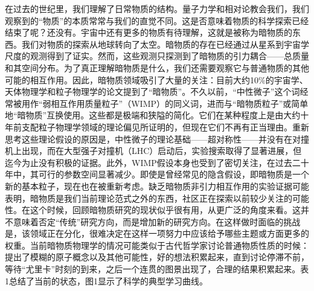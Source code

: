 
在过去的世纪里，我们理解了日常物质的结构。量子力学和相对论教会我们，我们观察到的“物质”的本质常常与我们的直觉不同。这是否意味着物质的科学探索已经结束了呢？还没有。宇宙中还有更多的物质有待理解，这就是被称为暗物质的东西。我们对物质的探索从地球转向了太空。暗物质的存在已经通过从星系到宇宙学尺度的观测得到了证实。然而，这些观测只探测到了暗物质的引力耦合——总质量和其空间分布。为了真正理解暗物质是什么，我们还需要观察它与普通物质的其他可能的相互作用。因此，暗物质领域吸引了大量的关注：目前大约10\%的宇宙学、天体物理学和粒子物理学的论文提到了“暗物质”。不久以前，“中性微子”这个词经常被用作“弱相互作用质量粒子”（WIMP）的同义词，进而与“暗物质粒子”或简单地“暗物质”互换使用。这些都是极端和狭隘的简化。它们在某种程度上是由大约十年前支配粒子物理学领域的理论偏见所证明的，但现在它们不再有正当理由。重新思考这些理论假设的原因是，中性微子的理论基础——超对称性——并没有在对撞机上出现，而在大型强子对撞机（LHC）启动后，实验搜索取得了显著进展，但迄今为止没有积极的证据。此外，WIMP假设本身也受到了密切关注，在过去二十年中，其可行的参数空间显著减少。即使是曾经常见的隐含假设，即暗物质是一个新的基本粒子，现在也在被重新考虑。缺乏暗物质非引力相互作用的实验证据可能表明，暗物质是我们当前理论范式之外的东西，社区正在探索以前较少关注的可能性。在这个时候，回顾暗物质研究的现状似乎很有用，从更广泛的角度来看。这并不意味着否定“传统”研究方向，而是增加新的研究方向。在这样做时面临的挑战是，该领域正在分化，很难决定在这样一项努力中应该给予哪些主题或方面更多的权重。当前暗物质物理学的情况可能类似于古代哲学家讨论普通物质性质的时候：提出了模糊的原子概念以及其他可能性，好的想法积累起来，直到讨论停滞不前，等待“尤里卡”时刻的到来，之后一个连贯的图景出现了，合理的结果积累起来。表1总结了当前的状态，图1显示了科学的典型学习曲线。